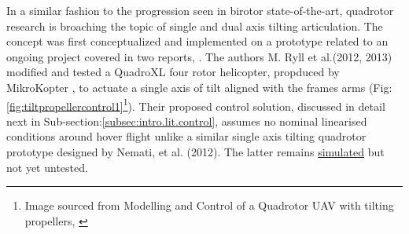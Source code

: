 \par
In a similar fashion to the progression seen in birotor state-of-the-art, quadrotor research is broaching the topic of single and dual axis tilting articulation. The concept was first conceptualized and implemented on a prototype related to an ongoing project covered in two reports, \cite{tiltpropellercontrol,tiltpropellerflight}. The authors M. Ryll et al.(2012, 2013) modified and tested a QuadroXL four rotor helicopter, propduced by MikroKopter \cite{mikrokopter}, to actuate a single axis of tilt aligned with the frames arms (Fig:\ref{fig:tiltpropellercontrol1}\footnote{Image sourced from Modelling and Control of a Quadrotor UAV with tilting propellers, \cite{tiltpropellercontrol}}). Their proposed control solution, discussed in detail next in Sub-section:\ref{subsec:intro.lit.control}, assumes no nominal linearised conditions around hover flight unlike a similar single axis tilting quadrotor prototype designed by Nemati, et al. (2012)\cite{singleaxistilting}. The latter remains  \underline{simulated} but not yet untested.
